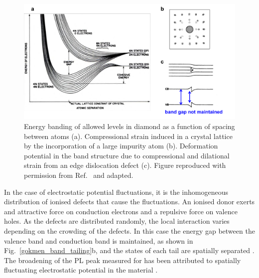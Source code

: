 \documentclass[11pt, twoside]{report}
\begin{document}
\begin{figure}[h!]
  \centering
    \includegraphics[width=1.0\textwidth]{figures/pankove_band_fluc.png}
    \caption[Energy banding of allowed levels in diamond as a function of spacing between atoms (a). Compressional strain induced in a crystal lattice by the incorporation of a large impurity atom (b). Deformation potential in the band structure due to compressional and dilational strain from an edge dislocation defect (c).]{Energy banding of allowed levels in diamond as a function of spacing between atoms (a). Compressional strain induced in a crystal lattice by the incorporation of a large impurity atom (b). Deformation potential in the band structure due to compressional and dilational strain from an edge dislocation defect (c). Figure reproduced with permission from Ref.~ and adapted.}
  \label{pankove_band_fluc}
\end{figure}

In the case of electrostatic potential fluctuations, it is the inhomogeneous distribution of ionised defects that cause the fluctuations. An ionised donor exerts and attractive force on conduction electrons and a repulsive force on valence holes. As the defects are distributed randomly, the local interaction varies depending on the crowding of the defects. In this case the energy gap between the valence band and conduction band is maintained, as shown in Fig.~\ref{gokmen_band_tailing}b, and the states of each tail are spatially separated \cite{Pankove}. The broadening of the PL peak measured for {\CZTS} has been attributed to spatially fluctuating electrostatic potential in the material \cite{CZTS_TEM}.

\end{document}
